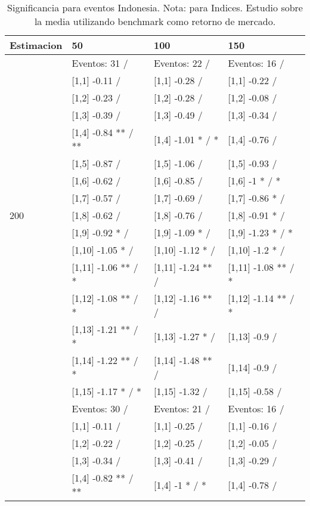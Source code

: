 \begin{table}

\caption{Significancia para eventos Indonesia. Nota: para Indices. Estudio sobre la media utilizando benchmark como retorno de mercado.}
\centering
\begin{tabular}[t]{llll}
\toprule
Estimacion & 50 & 100 & 150\\
\midrule
 & Eventos:  31 / & Eventos:  22 / & Eventos:  16 /\\
 & {}[1,1] -0.11  / & {}[1,1] -0.28  / & {}[1,1] -0.22  /\\
 & {}[1,2] -0.23  / & {}[1,2] -0.28  / & {}[1,2] -0.08  /\\
 & {}[1,3] -0.39  / & {}[1,3] -0.49  / & {}[1,3] -0.34  /\\
 & {}[1,4] -0.84 ** / ** & {}[1,4] -1.01 * / * & {}[1,4] -0.76  /\\
\addlinespace
 & {}[1,5] -0.87  / & {}[1,5] -1.06  / & {}[1,5] -0.93  /\\
 & {}[1,6] -0.62  / & {}[1,6] -0.85  / & {}[1,6] -1 * / *\\
 & {}[1,7] -0.57  / & {}[1,7] -0.69  / & {}[1,7] -0.86 * /\\
200 & {}[1,8] -0.62  / & {}[1,8] -0.76  / & {}[1,8] -0.91 * /\\
 & {}[1,9] -0.92 * / & {}[1,9] -1.09 * / & {}[1,9] -1.23 * / *\\
\addlinespace
 & {}[1,10] -1.05 * / & {}[1,10] -1.12 * / & {}[1,10] -1.2 * /\\
 & {}[1,11] -1.06 ** / * & {}[1,11] -1.24 ** / & {}[1,11] -1.08 ** / *\\
 & {}[1,12] -1.08 ** / * & {}[1,12] -1.16 ** / & {}[1,12] -1.14 ** / *\\
 & {}[1,13] -1.21 ** / * & {}[1,13] -1.27 * / & {}[1,13] -0.9  /\\
 & {}[1,14] -1.22 ** / * & {}[1,14] -1.48 ** / & {}[1,14] -0.9  /\\
\addlinespace
 & {}[1,15] -1.17 * / * & {}[1,15] -1.32  / & {}[1,15] -0.58  /\\
 & Eventos:  30 / & Eventos:  21 / & Eventos:  16 /\\
 & {}[1,1] -0.11  / & {}[1,1] -0.25  / & {}[1,1] -0.16  /\\
 & {}[1,2] -0.22  / & {}[1,2] -0.25  / & {}[1,2] -0.05  /\\
 & {}[1,3] -0.34  / & {}[1,3] -0.41  / & {}[1,3] -0.29  /\\
\addlinespace
 & {}[1,4] -0.82 ** / ** & {}[1,4] -1 * / * & {}[1,4] -0.78  /\\

\end{tabular}
\end{table}
